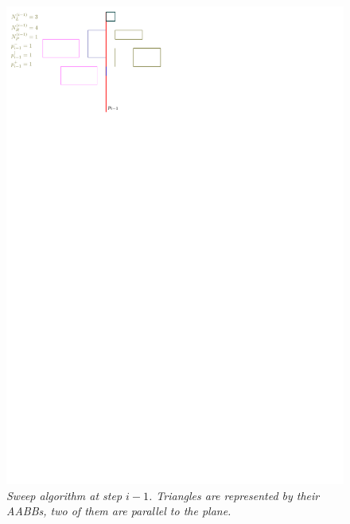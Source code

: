\documentclass[12pt]{article}
\begin{document}
\begin{figure}
\centering
\includegraphics{figs/sweep1}
\caption{\textit{Sweep algorithm at step $i-1$. Triangles are represented by their AABBs, two of them are parallel to the plane.}}
\label{figure:sweep1}
\end{figure}
\end{document}
